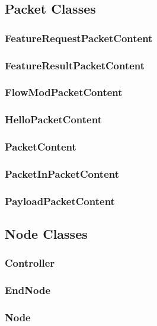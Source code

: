 \documentclass{article}
\begin{document}
\subsection{Packet Classes}

\subsubsection{FeatureRequestPacketContent}

\subsubsection{FeatureResultPacketContent}

\subsubsection{FlowModPacketContent}

\subsubsection{HelloPacketContent}

\subsubsection{PacketContent}

\subsubsection{PacketInPacketContent}

\subsubsection{PayloadPacketContent}

\subsection{Node Classes}

\subsubsection{Controller}

\subsubsection{EndNode}

\subsubsection{Node}
\end{document}
